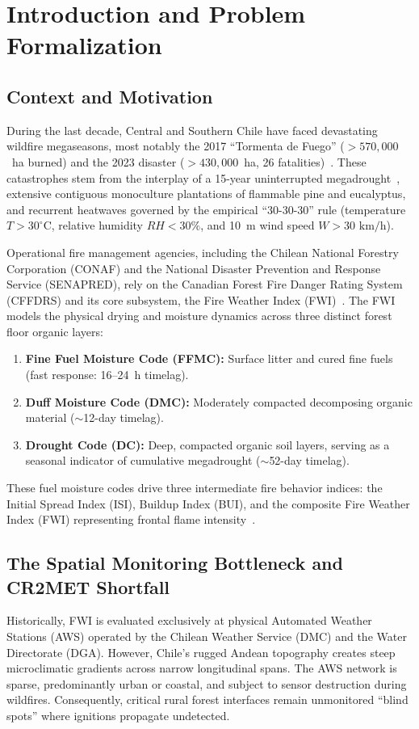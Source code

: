 \documentclass[10pt,conference]{IEEEtran}
\begin{document}
\section{Introduction and Problem Formalization}

\subsection{Context and Motivation}
During the last decade, Central and Southern Chile have faced devastating wildfire megaseasons, most notably the 2017 ``Tormenta de Fuego'' ($>570,000$~ha burned) and the 2023 disaster ($>430,000$~ha, 26 fatalities)~\cite{cordero2024extreme, bowman2019human}. These catastrophes stem from the interplay of a 15-year uninterrupted megadrought~\cite{garreaud2020central}, extensive contiguous monoculture plantations of flammable pine and eucalyptus, and recurrent heatwaves governed by the empirical ``30-30-30'' rule (temperature $T > 30^\circ\text{C}$, relative humidity $RH < 30\%$, and 10~m wind speed $W > 30\text{ km/h}$).

Operational fire management agencies, including the Chilean National Forestry Corporation (CONAF) and the National Disaster Prevention and Response Service (SENAPRED), rely on the Canadian Forest Fire Danger Rating System (CFFDRS) and its core subsystem, the Fire Weather Index (FWI)~\cite{vanwagner1987development}. The FWI models the physical drying and moisture dynamics across three distinct forest floor organic layers:
\begin{enumerate}
    \item \textbf{Fine Fuel Moisture Code (FFMC):} Surface litter and cured fine fuels (fast response: 16--24~h timelag).
    \item \textbf{Duff Moisture Code (DMC):} Moderately compacted decomposing organic material ($\sim$12-day timelag).
    \item \textbf{Drought Code (DC):} Deep, compacted organic soil layers, serving as a seasonal indicator of cumulative megadrought ($\sim$52-day timelag).
\end{enumerate}
These fuel moisture codes drive three intermediate fire behavior indices: the Initial Spread Index (ISI), Buildup Index (BUI), and the composite Fire Weather Index (FWI) representing frontal flame intensity~\cite{wotton2009interpreting}.

\subsection{The Spatial Monitoring Bottleneck and CR2MET Shortfall}
Historically, FWI is evaluated exclusively at physical Automated Weather Stations (AWS) operated by the Chilean Weather Service (DMC) and the Water Directorate (DGA). However, Chile's rugged Andean topography creates steep microclimatic gradients across narrow longitudinal spans. The AWS network is sparse, predominantly urban or coastal, and subject to sensor destruction during wildfires. Consequently, critical rural forest interfaces remain unmonitored ``blind spots'' where ignitions propagate undetected.
\end{document}
